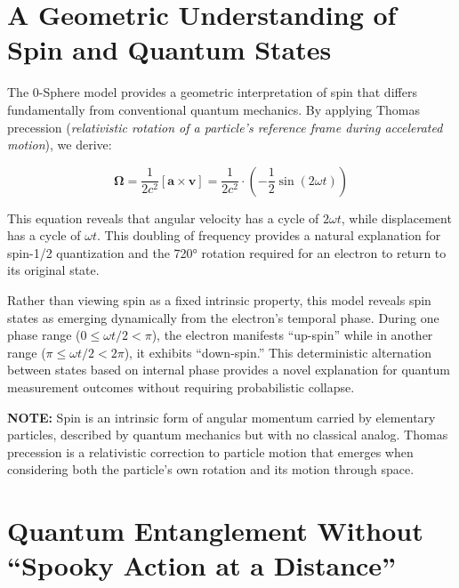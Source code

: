 \documentclass[12pt,letterpaper]{article} %
\begin{document}
\section{A Geometric Understanding of Spin and Quantum States}

The 0-Sphere model provides a geometric interpretation of spin that differs fundamentally from conventional quantum mechanics. By applying Thomas precession (\textit{relativistic rotation of a particle's reference frame during accelerated motion})\cite{thomas1926, thomas1927}, we derive:

\begin{equation}
\boldsymbol{\Omega} = \frac{1}{2c^2}[\boldsymbol{a} \times \boldsymbol{v}] = \frac{1}{2c^2} \cdot \left(-\frac{1}{2}\sin(2\omega t)\right)
\end{equation}

This equation reveals that angular velocity has a cycle of $2\omega t$, while displacement has a cycle of $\omega t$. This doubling of frequency provides a natural explanation for spin-1/2 quantization and the 720° rotation required for an electron to return to its original state\cite{hanamura2023}.

Rather than viewing spin as a fixed intrinsic property, this model reveals spin states as emerging dynamically from the electron's temporal phase. During one phase range ($0 \leq \omega t/2 < \pi$), the electron manifests ``up-spin'' while in another range ($\pi \leq \omega t/2 < 2\pi$), it exhibits ``down-spin.'' This deterministic alternation between states based on internal phase provides a novel explanation for quantum measurement outcomes without requiring probabilistic collapse\cite{weinberg1995}.

\vspace{0.5cm}
\noindent\textbf{NOTE:} Spin is an intrinsic form of angular momentum carried by elementary particles, described by quantum mechanics but with no classical analog. Thomas precession is a relativistic correction to particle motion that emerges when considering both the particle's own rotation and its motion through space.


\section{Quantum Entanglement Without ``Spooky Action at a Distance''}
\end{document}
